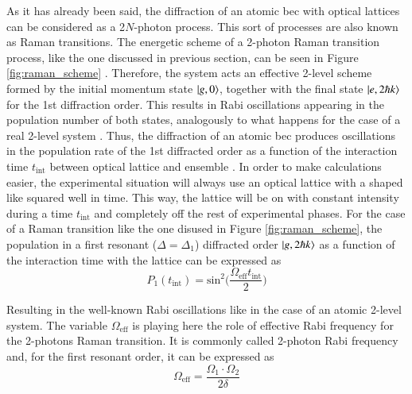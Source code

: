 As it has already been said, the diffraction of an atomic \ac{bec} with optical lattices can be considered as a 2$N$-photon process. This sort of processes are also known as Raman transitions. The energetic scheme of a 2-photon Raman transition process, like the one discussed in previous section, can be seen in Figure \ref{fig:raman_scheme} \cite{Kozuma1999}. Therefore, the system acts an effective 2-level scheme formed by the initial momentum state $\ket{g, 0}$, together with the final state $\ket{e, 2\hbar k}$ for the 1st diffraction order. This results in Rabi oscillations appearing in the population number of both states, analogously to what happens for the case of a real 2-level system \cite{Foot2005}. Thus, the diffraction of an atomic \ac{bec} produces oscillations in the population rate of the 1st diffracted order as a function of the interaction time $t_\text{int}$ between optical lattice and ensemble \cite{Martin1988}. In order to make calculations easier, the experimental situation will always use an optical lattice with a shaped like squared well in time. This way, the lattice will be on with constant intensity during a time $t_{\text{int}}$ and completely off the rest of experimental phases. For the case of a Raman transition like the one disused in Figure \ref{fig:raman_scheme}, the population in a first resonant ($\Delta=\Delta_1$) diffracted order $\ket{g, 2\hbar k}$ as a function of the interaction time with the lattice can be expressed as
\begin{equation}
	P_1(t_\text{int}) = \text{sin}^2\bigg(\frac{\Omega_\text{eff} t_\text{int}}{2}\bigg)
\end{equation}

Resulting in the well-known Rabi oscillations like in the case of an atomic 2-level system. The variable $\Omega_\text{eff}$ is playing here the role of effective Rabi frequency for the 2-photons Raman transition. It is commonly called 2-photon Rabi frequency and, for the first resonant order, it can be expressed as
\begin{equation}\label{eq:effective_Rabi_frequency}
	\Omega_\text{eff} = \frac{\Omega_1 \cdot \Omega_2}{2\delta}
\end{equation}

